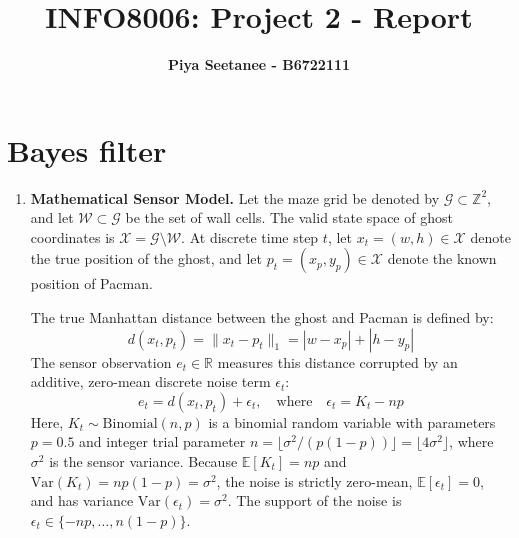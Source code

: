 \documentclass{article}
\begin{document}

\title{\Large{INFO8006: Project 2 - Report}}
\vspace{1cm}
\author{\small{\bf Piya Seetanee - B6722111}}

\maketitle


\section{Bayes filter}

\begin{enumerate}[label=\alph*.,leftmargin=*]
    \item \textbf{Mathematical Sensor Model.}
    Let the maze grid be denoted by $\mathcal{G} \subset \mathbb{Z}^2$, and let $\mathcal{W} \subset \mathcal{G}$ be the set of wall cells. The valid state space of ghost coordinates is $\mathcal{X} = \mathcal{G} \setminus \mathcal{W}$. At discrete time step $t$, let $x_t = (w, h) \in \mathcal{X}$ denote the true position of the ghost, and let $p_t = (x_p, y_p) \in \mathcal{X}$ denote the known position of Pacman.

    The true Manhattan distance between the ghost and Pacman is defined by:
    \begin{equation}
        d(x_t, p_t) = \|x_t - p_t\|_1 = |w - x_p| + |h - y_p|
    \end{equation}
    The sensor observation $e_t \in \mathbb{R}$ measures this distance corrupted by an additive, zero-mean discrete noise term $\epsilon_t$:
    \begin{equation}
        e_t = d(x_t, p_t) + \epsilon_t, \quad \text{where} \quad \epsilon_t = K_t - n p
    \end{equation}
    Here, $K_t \sim \text{Binomial}(n, p)$ is a binomial random variable with parameters $p = 0.5$ and integer trial parameter $n = \lfloor \sigma^2 / (p(1-p)) \rfloor = \lfloor 4\sigma^2 \rfloor$, where $\sigma^2$ is the sensor variance. Because $\mathbb{E}[K_t] = np$ and $\text{Var}(K_t) = np(1-p) = \sigma^2$, the noise is strictly zero-mean, $\mathbb{E}[\epsilon_t] = 0$, and has variance $\text{Var}(\epsilon_t) = \sigma^2$. The support of the noise is $\epsilon_t \in \{-np, \dots, n(1-p)\}$.


\end{enumerate}
\end{document}
